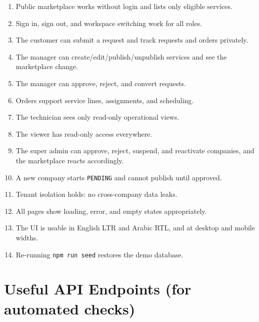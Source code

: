 \documentclass[11pt,a4paper]{article}
\begin{document}
\begin{enumerate}[leftmargin=2em, itemsep=2pt]
  \item Public marketplace works without login and lists only eligible services.
  \item Sign in, sign out, and workspace switching work for all roles.
  \item The customer can submit a request and track requests and orders privately.
  \item The manager can create/edit/publish/unpublish services and see the marketplace change.
  \item The manager can approve, reject, and convert requests.
  \item Orders support service lines, assignments, and scheduling.
  \item The technician sees only read-only operational views.
  \item The viewer has read-only access everywhere.
  \item The super admin can approve, reject, suspend, and reactivate companies, and the marketplace reacts accordingly.
  \item A new company starts \texttt{PENDING} and cannot publish until approved.
  \item Tenant isolation holds: no cross-company data leaks.
  \item All pages show loading, error, and empty states appropriately.
  \item The UI is usable in English LTR and Arabic RTL, and at desktop and mobile widths.
  \item Re-running \texttt{npm run seed} restores the demo database.
\end{enumerate}

\section{Useful API Endpoints (for automated checks)}
\label{sec:api}
\end{document}
